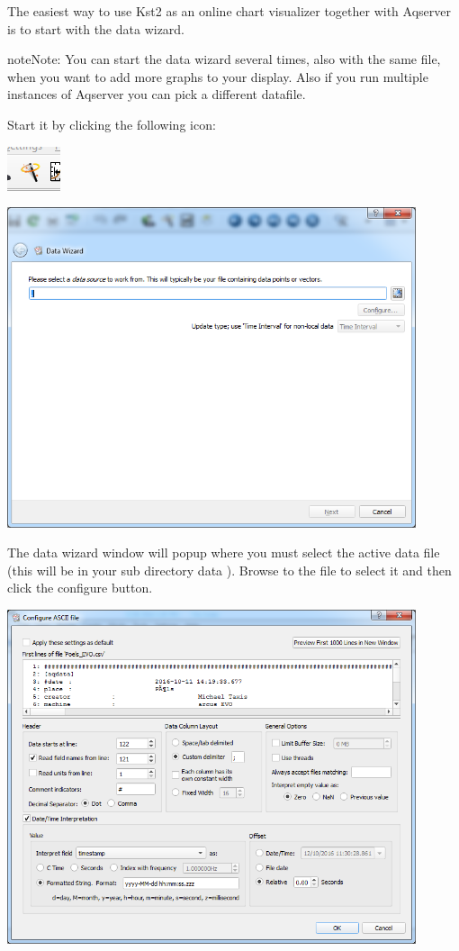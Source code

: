 \documentclass[a4paper,10pt,english]{sphinxmanual}
\begin{document}
The easiest way to use Kst2 as an online chart visualizer together with Aqserver is to start with the data wizard.

\begin{notice}{note}{Note:}
You can start the data wizard several times, also with the same file, when you want to add more graphs to your display. Also if you run multiple instances of Aqserver you can pick a different datafile.
\end{notice}

Start it by clicking the following icon:

{\hfill\includegraphics{wizard.png}\hfill}

{\hfill\includegraphics[width=12cm]{wiz1.png}\hfill}

The data wizard window will popup where you must select the active data file (this will be in your sub directory data ). Browse to the file to select it and then click the configure button.

{\hfill\includegraphics[width=12cm]{wiz2.png}\hfill}
\end{document}
